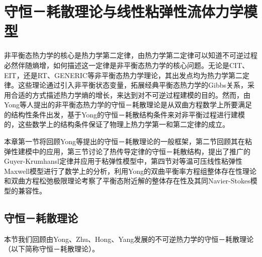  \chapter{守恒－耗散理论与线性粘弹性流体力学模型}

 	非平衡态热力学的核心是热力学第二定律，由热力学第二定律可以知道不可逆过程必然伴随熵增，如何描述这一定律是非平衡态热力学的核心问题。无论是CIT、EIT，还是RT、GENERIC等非平衡态热力学理论，其出发点均为热力学第二定律。这些理论通过引入非平衡状态变量，拓展经典平衡态热力学的Gibbs关系，采用合适的方式描述热力学熵的增长，来达到对不可逆过程建模的目的\cite{ottinger2005beyond,jou1996extended}。然而，由Yong等人提出的非平衡态热力学的守恒－耗散理论是从双曲方程数学上所要满足的结构性条件出发，基于Yong的守恒－耗散结构条件来对非平衡过程进行建模的，这些数学上的结构条件保证了物理上热力学第一和第二定律的成立\cite{zhu2014conservation}。
	
	本章第一节将回顾Yong等提出的守恒－耗散理论的一般框架，第二节回顾其在粘弹性建模中的应用，第三节讨论了热传导定律的守恒－耗散结构，提出了推广的Guyer-Krumhansl定律并应用于粘弹性模型中，第四节对等温可压线性粘弹性Maxwell模型进行了数学上的分析，利用Yong的双曲平衡率方程组整体存在性理论和双曲方程松弛极限理论考察了平衡态附近解的整体存在性及其同Navier-Stokes模型的兼容性。

	\section{守恒－耗散理论}
	本节我们回顾由Yong、Zhu、Hong、Yang发展的不可逆热力学的守恒－耗散理论（以下简称守恒－耗散理论）\cite{zhu2014conservation}。

